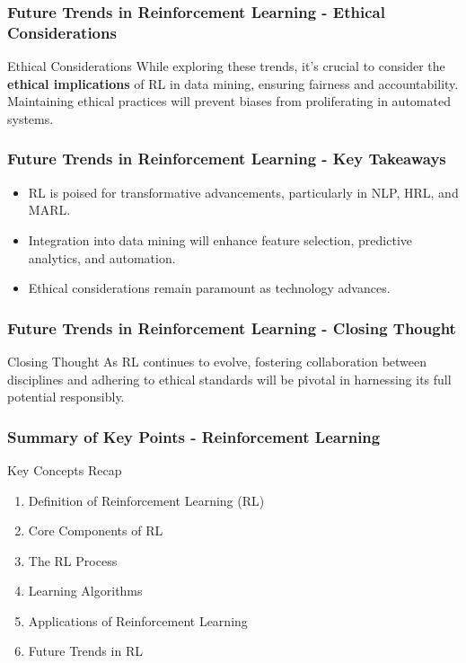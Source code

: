 \documentclass[aspectratio=169]{beamer}
\begin{document}
\begin{frame}[fragile]
    \frametitle{Future Trends in Reinforcement Learning - Ethical Considerations}
    \begin{block}{Ethical Considerations}
        While exploring these trends, it’s crucial to consider the \textbf{ethical implications} of RL in data mining, ensuring fairness and accountability. Maintaining ethical practices will prevent biases from proliferating in automated systems.
    \end{block}
\end{frame}

\begin{frame}[fragile]
    \frametitle{Future Trends in Reinforcement Learning - Key Takeaways}
    \begin{itemize}
        \item RL is poised for transformative advancements, particularly in NLP, HRL, and MARL.
        \item Integration into data mining will enhance feature selection, predictive analytics, and automation.
        \item Ethical considerations remain paramount as technology advances.
    \end{itemize}
\end{frame}

\begin{frame}[fragile]
    \frametitle{Future Trends in Reinforcement Learning - Closing Thought}
    \begin{block}{Closing Thought}
        As RL continues to evolve, fostering collaboration between disciplines and adhering to ethical standards will be pivotal in harnessing its full potential responsibly.
    \end{block}
\end{frame}

\begin{frame}[fragile]
    \frametitle{Summary of Key Points - Reinforcement Learning}
    \begin{block}{Key Concepts Recap}
        \begin{enumerate}
            \item Definition of Reinforcement Learning (RL)
            \item Core Components of RL
            \item The RL Process
            \item Learning Algorithms
            \item Applications of Reinforcement Learning
            \item Future Trends in RL
        \end{enumerate}
    \end{block}
\end{frame}
\end{document}
